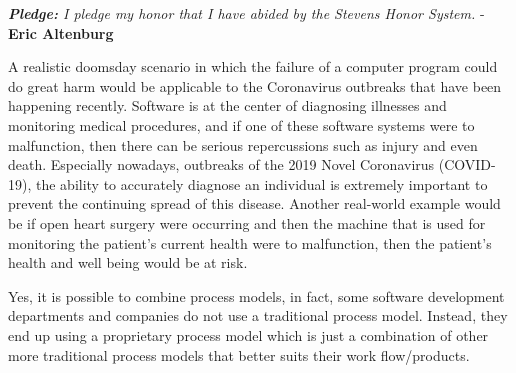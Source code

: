 \newcommand\NAME{Eric Altenburg}  %
\newcommand\COURSE{CS 347}
\newcommand\HWNUM{1}              %


\begin{center}
	\textit{\textbf{Pledge:} I pledge my honor that I have abided by the Stevens Honor System.} - \textbf{\NAME}
\end{center}


	A realistic doomsday scenario in which the failure of a computer program could do great harm would be applicable to the Coronavirus outbreaks that have been happening recently. Software is at the center of diagnosing illnesses and monitoring medical procedures, and if one of these software systems were to malfunction, then there can be serious repercussions such as injury and even death. Especially nowadays, outbreaks of the 2019 Novel Coronavirus (COVID-19), the ability to accurately diagnose an individual is extremely important to prevent the continuing spread of this disease. Another real-world example would be if open heart surgery were occurring and then the machine that is used for monitoring the patient's current health were to malfunction, then the patient's health and well being would be at risk. 
	

	Yes, it is possible to combine process models, in fact, some software development departments and companies do not use a traditional process model. Instead, they end up using a proprietary process model which is just a combination of other more traditional process models that better suits their work flow/products.\par

